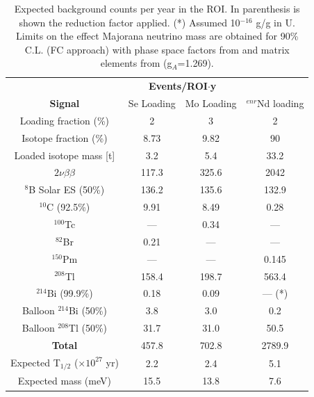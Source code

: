 \begin{table}
\centering
\begin{tabular}{cccc}
\toprule
                          & \multicolumn{2}{c}{\bf Events/ROI$\cdot$y} \\
{\bf Signal}              & Se Loading & Mo Loading  & $^{enr}$Nd loading\\
\midrule
Loading fraction (\%) & 2 & 3 & 2 \\
Isotope fraction (\%) & 8.73 & 9.82 & 90 \\
Loaded isotope mass [t] & 3.2 & 5.4 & 33.2 \\
\midrule
$2\nu\beta\beta$          & 117.3 &  325.6  & 2042     \\
$^8$B Solar ES  (50\%)           & 136.2     & 135.6 & 132.9      \\
$^{10}$C  (92.5\%)                & 9.91       & 8.49 & 0.28       \\
$^{100}$Tc                 & ---       & 0.34 & ---        \\
$^{82}$Br                & 0.21        & --- & ---        \\
$^{150}$Pm                & ---        & --- & 0.145       \\
$^{208}$Tl                & 158.4       & 198.7 & 563.4      \\
$^{214}$Bi  (99.9\%)               & 0.18        & 0.09 & --- (*)        \\
Balloon $^{214}$Bi  (50\%)       & 3.8       & 3.0 & 0.2       \\
Balloon $^{208}$Tl  (50\%)      & 31.7       & 31.0 & 50.5       \\
\midrule
{\bf Total}               & 457.8      & 702.8 & 2789.9      \\ \hline \hline
Expected T$_{1/2}$ ($\times10^{27}$ yr) & 2.2 & 2.4 & 5.1 \\
Expected mass (meV) & 15.5 & 13.8 & 7.6 \\ \hline
\bottomrule
\end{tabular}
\caption{Expected background counts per year in the ROI. In parenthesis is shown the reduction factor applied. (*) Assumed 10$^{-16}$ g/g in U. Limits on the effect Majorana neutrino mass are obtained for 90\% C.L. (FC approach) with phase space factors from \cite{2012PhRvC..85c4316K} and matrix elements from \cite{Barea:2013wb} (g$_{A}$=1.269).}
\label{table::dbd::alternatives}
\end{table}

